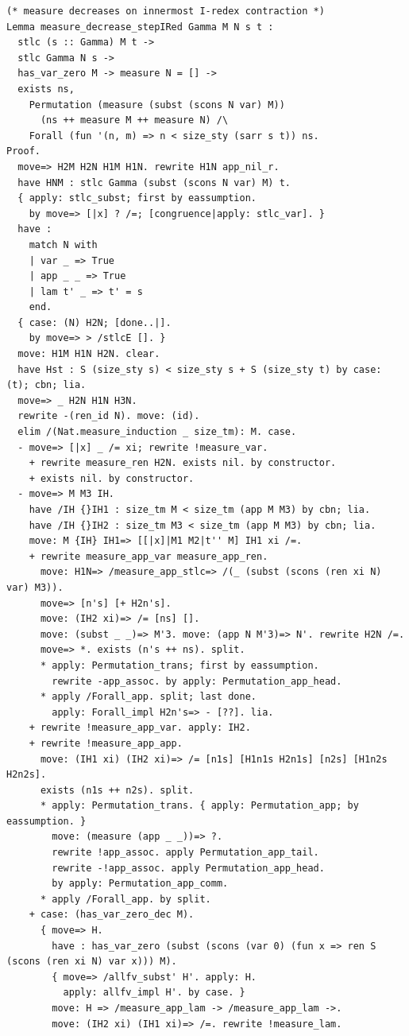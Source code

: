 \documentclass[10pt,a4paper]{article}
\begin{document}
\begin{lstlisting}[style=authorcoq]
(* measure decreases on innermost I-redex contraction *)
Lemma measure_decrease_stepIRed Gamma M N s t :
  stlc (s :: Gamma) M t ->
  stlc Gamma N s ->
  has_var_zero M -> measure N = [] ->
  exists ns,
    Permutation (measure (subst (scons N var) M))
      (ns ++ measure M ++ measure N) /\
    Forall (fun '(n, m) => n < size_sty (sarr s t)) ns.
Proof.
  move=> H2M H2N H1M H1N. rewrite H1N app_nil_r.
  have HNM : stlc Gamma (subst (scons N var) M) t.
  { apply: stlc_subst; first by eassumption.
    by move=> [|x] ? /=; [congruence|apply: stlc_var]. }
  have :
    match N with
    | var _ => True
    | app _ _ => True
    | lam t' _ => t' = s
    end.
  { case: (N) H2N; [done..|].
    by move=> > /stlcE []. }
  move: H1M H1N H2N. clear.
  have Hst : S (size_sty s) < size_sty s + S (size_sty t) by case: (t); cbn; lia.
  move=> _ H2N H1N H3N.
  rewrite -(ren_id N). move: (id).
  elim /(Nat.measure_induction _ size_tm): M. case.
  - move=> [|x] _ /= xi; rewrite !measure_var.
    + rewrite measure_ren H2N. exists nil. by constructor.
    + exists nil. by constructor.
  - move=> M M3 IH.
    have /IH {}IH1 : size_tm M < size_tm (app M M3) by cbn; lia.
    have /IH {}IH2 : size_tm M3 < size_tm (app M M3) by cbn; lia.
    move: M {IH} IH1=> [[|x]|M1 M2|t'' M] IH1 xi /=.
    + rewrite measure_app_var measure_app_ren.
      move: H1N=> /measure_app_stlc=> /(_ (subst (scons (ren xi N) var) M3)).
      move=> [n's] [+ H2n's].
      move: (IH2 xi)=> /= [ns] [].
      move: (subst _ _)=> M'3. move: (app N M'3)=> N'. rewrite H2N /=.
      move=> *. exists (n's ++ ns). split.
      * apply: Permutation_trans; first by eassumption.
        rewrite -app_assoc. by apply: Permutation_app_head.
      * apply /Forall_app. split; last done.
        apply: Forall_impl H2n's=> - [??]. lia.
    + rewrite !measure_app_var. apply: IH2.
    + rewrite !measure_app_app.
      move: (IH1 xi) (IH2 xi)=> /= [n1s] [H1n1s H2n1s] [n2s] [H1n2s H2n2s].
      exists (n1s ++ n2s). split.
      * apply: Permutation_trans. { apply: Permutation_app; by eassumption. }
        move: (measure (app _ _))=> ?.
        rewrite !app_assoc. apply Permutation_app_tail.
        rewrite -!app_assoc. apply Permutation_app_head.
        by apply: Permutation_app_comm.
      * apply /Forall_app. by split.
    + case: (has_var_zero_dec M).
      { move=> H.
        have : has_var_zero (subst (scons (var 0) (fun x => ren S (scons (ren xi N) var x))) M).
        { move=> /allfv_subst' H'. apply: H.
          apply: allfv_impl H'. by case. }
        move: H => /measure_app_lam -> /measure_app_lam ->.
        move: (IH2 xi) (IH1 xi)=> /=. rewrite !measure_lam.

\end{lstlisting}
\end{document}

